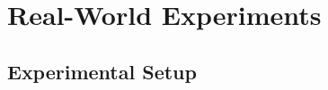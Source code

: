%     
    

\section{Real-World Experiments} \label {sec:results_r}


\subsection{Experimental Setup}


